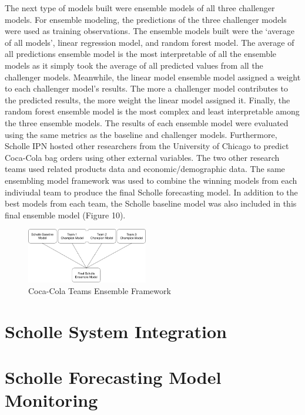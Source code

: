 \documentclass[12pt,oneside]{chicagocapstone}
\begin{document}
The next type of models built were ensemble models of all three challenger models. For ensemble modeling, the predictions of the three challenger models were used as training observations. The ensemble models built were the `average of all models', linear regression model, and random forest model. The average of all predictions ensemble model is the most interpretable of all the ensemble models as it simply took the average of all predicted values from all the challenger models. Meanwhile, the linear model ensemble model assigned a weight to each challenger model's results. The more a challenger model contributes to the predicted results, the more weight the linear model assigned it. Finally, the random forest ensemble model is the most complex and least interpretable among the three ensemble models. The results of each ensemble model were evaluated using the same metrics as the baseline and challenger models. Furthermore, Scholle IPN hosted other researchers from the University of Chicago to predict Coca-Cola bag orders using other external variables. The two other research teams used related products data and economic/demographic data. The same ensembling model framework was used to combine the winning models from each indiviudal team to produce the final Scholle forecasting model. In addition to the best models from each team, the Scholle baseline model was also included in this final ensemble model (Figure 10).
\begin{figure}

{\centering \includegraphics[width=200px,angle = 0, scale=2.1]{figure/coke_ensemble_framework} 

}

\caption{Coca-Cola Teams Ensemble Framework}\label{fig:GoogleTrends3}
\end{figure}
\hypertarget{scholle-system-integration}{%
\section*{Scholle System Integration}\label{scholle-system-integration}}

\hypertarget{scholle-forecasting-model-monitoring}{%
\section*{Scholle Forecasting Model Monitoring}\label{scholle-forecasting-model-monitoring}}
\end{document}
